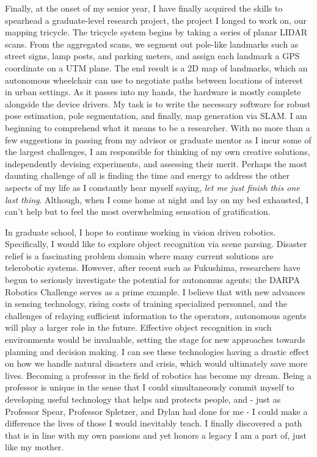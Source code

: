 \documentclass[10pt]{article}
\begin{document}
Finally, at the onset of my senior year, I have finally acquired the skills to
spearhead a graduate-level research project, the project I longed to work on,
our mapping tricycle. The tricycle system begins by taking a series of planar
LIDAR scans. From the aggregated scans, we segment out pole-like landmarks such
as street signs, lamp posts, and parking meters, and assign each landmark a GPS
coordinate on a UTM plane.  The end result is a 2D map of landmarks, which an
autonomous wheelchair can use to negotiate paths between locations of interest
in urban settings. As it passes into my hands, the hardware is mostly complete
alongside the device drivers. My task is to write the necessary software for
robust pose estimation, pole segmentation, and finally, map generation via
SLAM. I am beginning to comprehend what it means to be a researcher. With no
more than a few suggestions in passing from my advisor or graduate mentor as I
incur some of the largest challenges, I am responsible for thinking of my own
creative solutions, independently devising experiments, and assessing their
merit.  Perhaps the most daunting challenge of all is finding the time  and
energy to address the other aspects of my life as I constantly hear myself
saying, \emph{let me just finish this one last thing}. Although, when I come
home at night and lay on my bed exhausted, I can't help but to feel the most
overwhelming sensation of gratification.

In graduate school, I hope to continue working in vision driven robotics.
Specifically, I would like to explore object recognition via scene parsing.
Disaster relief is a fascinating problem domain where many current solutions
are telerobotic systems. However, after recent such as Fukushima, researchers
have begun to seriously investigate the potential for autonomus agents; the
DARPA Robotics Challenge serves as a prime example. I believe that with new
advances in sensing technology, rising costs of training specialized personnel,
and the challenges of relaying sufficient information to the operators,
autonomous agents will play a larger role in the future. Effective object
recognition in such environments would be invaluable, setting the stage for new
approaches towards planning and decision making. I can see these technologies
having a drastic effect on how we handle natural disasters and crisis, which
would ultimately save more lives. Becoming a professor in the field of robotics
has become my dream. Being a professor is unique in the sense that I could
simultaneously commit myself to developing useful technology that helps and
protects people, and - just as Professor Spear, Professor Spletzer, and Dylan
had done for me - I could make a difference the lives of those I would
inevitably teach. I finally discovered a path that is in line with my own
passions and yet honors a legacy I am a part of, just like my mother.
\end{document}
